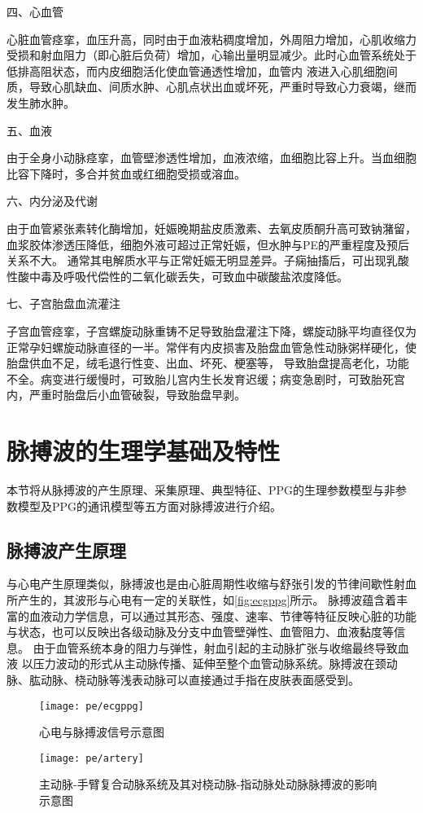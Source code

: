 四、心血管

心脏血管痉挛，血压升高，同时由于血液粘稠度增加，外周阻力增加，心肌收缩力受损和射血阻力（即心脏后负荷）增加，心输出量明显减少。此时心血管系统处于低排高阻状态，而内皮细胞活化使血管通透性增加，血管内
液进入心肌细胞间质，导致心肌缺血、间质水肿、心肌点状出血或坏死，严重时导致心力衰竭，继而发生肺水肿。

五、血液

由于全身小动脉痉挛，血管壁渗透性增加，血液浓缩，血细胞比容上升。当血细胞比容下降时，多合并贫血或红细胞受损或溶血。

六、内分泌及代谢

由于血管紧张素转化酶增加，妊娠晚期盐皮质激素、去氧皮质酮升高可致钠潴留，血浆胶体渗透压降低，细胞外液可超过正常妊娠，但水肿与PE的严重程度及预后关系不大。
通常其电解质水平与正常妊娠无明显差异。子痫抽搐后，可出现乳酸性酸中毒及呼吸代偿性的二氧化碳丢失，可致血中碳酸盐浓度降低。

七、子宫胎盘血流灌注

子宫血管痉挛，子宫螺旋动脉重铸不足导致胎盘灌注下降，螺旋动脉平均直径仅为正常孕妇螺旋动脉直径的一半。常伴有内皮损害及胎盘血管急性动脉粥样硬化，使胎盘供血不足，绒毛退行性变、出血、坏死、梗塞等，
导致胎盘提高老化，功能不全。病变进行缓慢时，可致胎儿宫内生长发育迟缓；病变急剧时，可致胎死宫内，严重时胎盘后小血管破裂，导致胎盘早剥。

\section{脉搏波的生理学基础及特性}
本节将从脉搏波的产生原理、采集原理、典型特征、PPG的生理参数模型与非参数模型及PPG的通讯模型等五方面对脉搏波进行介绍。

\subsection{脉搏波产生原理}
与心电产生原理类似，脉搏波也是由心脏周期性收缩与舒张引发的节律间歇性射血所产生的，其波形与心电有一定的关联性，如\autoref{fig:ecgppg}所示\cite{Allen2007}。
脉搏波蕴含着丰富的血液动力学信息，可以通过其形态、强度、速率、节律等特征反映心脏的功能与状态，也可以反映出各级动脉及分支中血管壁弹性、血管阻力、血液黏度等信息。
由于血管系统本身的阻力与弹性，射血引起的主动脉扩张与收缩最终导致血液
以压力波动的形式从主动脉传播、延伸至整个血管动脉系统。脉搏波在颈动脉、肱动脉、桡动脉等浅表动脉可以直接通过手指在皮肤表面感受到\cite{PPGYY}。
\begin{figure}[htbp]
    \centering
    \texttt{[image: pe/ecgppg]}
    \caption[心电与脉搏波信号示意图]{\label{fig:ecgppg}心电与脉搏波信号示意图\cite{Allen2007}}
\end{figure}
\begin{figure}[htbp]
    \centering
    \texttt{[image: pe/artery]}
    \caption[主动脉-手臂复合动脉系统及其对桡动脉-指动脉处动脉脉搏波的影响示意图]{\label{fig:artery}主动脉-手臂复合动脉系统及其对桡动脉-指动脉处动脉脉搏波的影响示意图\cite{THOCBPM}}
\end{figure}

